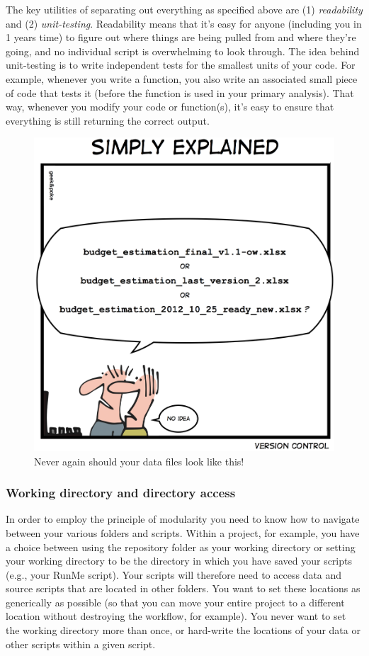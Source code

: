 \documentclass[12pt,letterpaper]{article}
\begin{document}
The key utilities of separating out everything as specified above are (1) \emph{readability} and (2) \emph{unit-testing}.    Readability means that it's easy for anyone (including you in 1 years time) to figure out where things are being pulled from and where they're going, and no individual script is overwhelming to look through.  The idea behind unit-testing is to write independent tests for the smallest units of your code.  For example, whenever you write a function, you also write an associated small piece of code that tests it (before the function is used in your primary analysis). That way, whenever you modify your code or function(s), it's easy to ensure that everything is still returning the correct output.



\begin{figure}
	\centering
	\includegraphics[width=0.5\linewidth]{figs/datafilenames.jpg}
	\caption{Never again should your data files look like this!}
	\label{fig:datafilenames}
\end{figure}

\subsubsection{Working directory and directory access}
In order to employ the principle of modularity you need to know how to navigate between your various folders and scripts.  Within a project, for example, you have a choice between using the repository folder as your working directory or setting your working directory to be the directory in which you have saved your scripts (e.g., your RunMe script). Your scripts will therefore need to access data and source scripts that are located in other folders.  You want to set these locations as generically as possible (so that you can move your entire project to a different location without destroying the workflow, for example).  You never want to set the working directory more than once, or hard-write the locations of your data or other scripts within a given script.  
\end{document}
